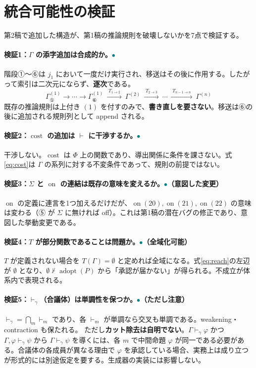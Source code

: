 \documentclass[11pt,a4paper]{article}
\newcommand{\adopt}{\operatorname{adopt}}
\newcommand{\on}{\operatorname{on}}
\newcommand{\cost}{\operatorname{cost}}
\newcommand{\OK}{\textcolor{teal}{$\bullet$}}
\begin{document}
\section{統合可能性の検証}

第2稿で追加した構造が、第1稿の推論規則を破壊しないかを7点で検証する。

\paragraph{検証1：$\Gamma$ の添字追加は合成的か。\quad\OK}
階段①〜⑥は $j_1$ において一度だけ実行され、移送はその後に作用する。したがって索引は二次元にならず、\textbf{逐次}である。
\[
\Gamma^{(1)}_{①} \to \cdots \to \Gamma^{(1)}_{⑥}
\ \xrightarrow{\;T_{1\to2}\;}\ \Gamma^{(2)}
\ \xrightarrow{\;T_{2\to3}\;}\ \cdots
\ \xrightarrow{\;T_{n-1\to n}\;}\ \Gamma^{(n)}
\]
既存の推論規則は上付き $(1)$ を付すのみで、\textbf{書き直しを要さない}。移送は⑥の後に追加される規則列として append される。

\paragraph{検証2：$\cost$ の追加は $\vdash$ に干渉するか。\quad\OK}
干渉しない。$\cost$ は $\Phi$ 上の関数であり、導出関係に条件を課さない。式\eqref{eq:cost}は $\Gamma$ の系列に対する不変条件であって、規則の前提ではない。

\paragraph{検証3：$\Sigma$ と $\on$ の連結は既存の意味を変えるか。\quad\OK（意図した変更）}
$\on$ の定義に連言を1つ加えるだけだが、$\on(20),\on(21),\on(22)$ の意味は変わる（⑤ が $\Sigma$ に無ければ off）。これは第1稿の潜在バグの修正であり、意図した挙動変更である。

\paragraph{検証4：$T$ が部分関数であることは問題か。\quad\OK（全域化可能）}
$T$ が定義されない場合を $T(\Gamma) = \emptyset$ と定めれば全域になる。式\eqref{eq:reach}の左辺が $\emptyset$ となり、$\emptyset \nvdash \adopt(P)$ から「承認が届かない」が得られる。不成立が体系内で表現される。

\paragraph{検証5：$\vdash_{\gamma}$（合議体）は単調性を保つか。\quad\OK（ただし注意）}
$\vdash_\gamma = \bigcap_m \vdash_m$ であり、各 $\vdash_m$ が単調なら交叉も単調である。weakening・contraction も保たれる。
ただし\textbf{カット除去は自明でない}。$\Gamma \vdash_\gamma \varphi$ かつ $\Gamma,\varphi \vdash_\gamma \psi$ から $\Gamma \vdash_\gamma \psi$ を導くには、各 $m$ で中間命題 $\varphi$ が同一である必要がある。合議体の各成員が異なる理由で $\varphi$ を承認している場合、実務上は成り立つが形式的には別途仮定を要する。生成器の実装には影響しない。
\end{document}
